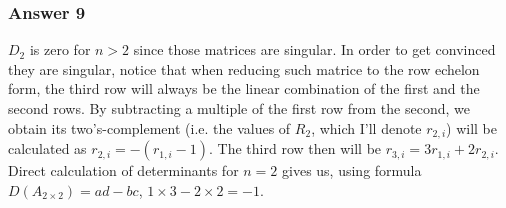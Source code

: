 \documentclass[11pt]{article}
\begin{document}
\subsubsection{Answer 9}
\label{sec-1-5-2}
$D_2$ is zero for $n>2$ since those matrices are singular.  In order to get
convinced they are singular, notice that when reducing such matrice to the
row echelon form, the third row will always be the linear combination of the
first and the second rows.  By subtracting a multiple of the first row from
the second, we obtain its two's-complement (i.e. the values of $R_2$, which
I'll denote $r_{2,i}$) will be calculated as $r_{2,i}=-(r_{1,i}-1)$.
The third row then will be $r_{3,i}=3r_{1,i}+2r_{2,i}$.  Direct calculation
of determinants for $n=2$ gives us, using formula $D(A_{2\times 2})=ad-bc$,
$1\times 3-2\times 2=-1$.
\end{document}
